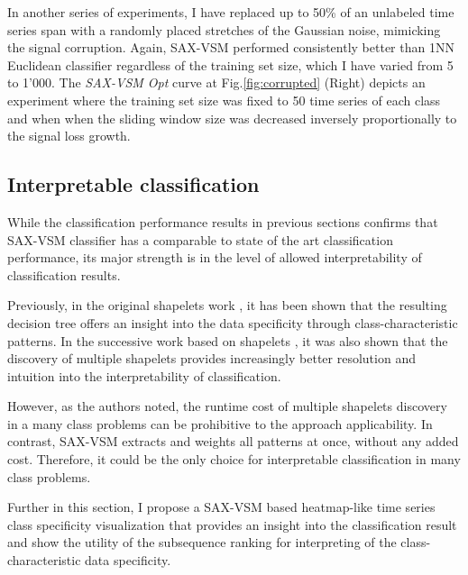 In another series of experiments, I have replaced up to 50\% of an unlabeled time series span with a randomly placed 
stretches of the Gaussian noise, mimicking the signal corruption. 
Again, SAX-VSM performed consistently better than 1NN Euclidean classifier regardless of the training set size, 
which I have varied from 5 to 1'000. 
The \textit{SAX-VSM Opt} curve at Fig.\ref{fig:corrupted} (Right) depicts an experiment where the training set size
was fixed to 50 time series of each class and when when the sliding window size was decreased inversely proportionally 
to the signal loss growth.

\subsection{Interpretable classification}
While the classification performance results in previous sections confirms that SAX-VSM 
classifier has a comparable to state of the art classification performance, 
its major strength is in the level of allowed interpretability of classification results. 

Previously, in the original shapelets work \cite{citeulike:7344347, citeulike:11957982}, it has been shown 
that the resulting decision tree offers an insight into the data specificity through class-characteristic patterns.
In the successive work based on shapelets \cite{citeulike:11345338}, it was also shown that the 
discovery of multiple shapelets provides increasingly better resolution and intuition into the interpretability 
of classification. 

However, as the authors noted, the runtime cost of multiple shapelets discovery in a many class problems 
can be prohibitive to the approach applicability. In contrast, SAX-VSM extracts and weights all patterns at once, 
without any added cost. Therefore, it could be the only choice for interpretable classification in many class problems.

Further in this section, I propose a SAX-VSM based heatmap-like time series class specificity visualization 
that provides an insight into the classification result and show the utility of the subsequence ranking for 
interpreting of the class-characteristic data specificity.

